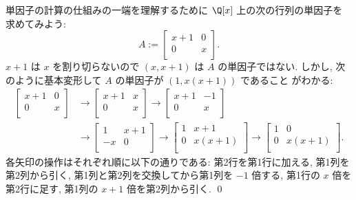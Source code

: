 \documentclass[12pt,twoside]{jarticle}
\begin{document}

\begin{example}
\label{example:elem-div-1}
  単因子の計算の仕組みの一端を理解するために $\Q[x]$ 上の次の行列の単因子を
  求めてみよう:
  \begin{equation*}
    A := 
    \begin{bmatrix}
      x+1 & 0  \\
       0  & x \\
    \end{bmatrix}.
  \end{equation*}
  $x+1$ は $x$ を割り切らないので $(x,x+1)$ は $A$ の単因子ではない.
  しかし, 次のように基本変形して $A$ の単因子が $(1,x(x+1))$ であること
  がわかる:
  \begin{align*}
    \begin{bmatrix}
      x+1 & 0 \\
       0  & x \\
    \end{bmatrix}
    &
    \to
    \begin{bmatrix}
      x+1 & x \\
       0  & x \\
    \end{bmatrix}
    \to
    \begin{bmatrix}
      x+1 & -1 \\
       0  &  x \\
    \end{bmatrix}
    \\ &
    \to
    \begin{bmatrix}
      1  & x+1 \\
      -x &  0  \\
    \end{bmatrix}
    \to
    \begin{bmatrix}
      1 & x+1 \\
      0 & x(x+1) \\
    \end{bmatrix}
    \to
    \begin{bmatrix}
      1 & 0 \\
      0 & x(x+1) \\
    \end{bmatrix}.
  \end{align*}
  各矢印の操作はそれぞれ順に以下の通りである: 
  第2行を第1行に加える, 
  第1列を第2列から引く,
  第1列と第2列を交換してから第1列を $-1$ 倍する,
  第1行の $x$ 倍を第2行に足す,
  第1列の $x+1$ 倍を第2列から引く.
  \qed
\end{example}
\end{document}
